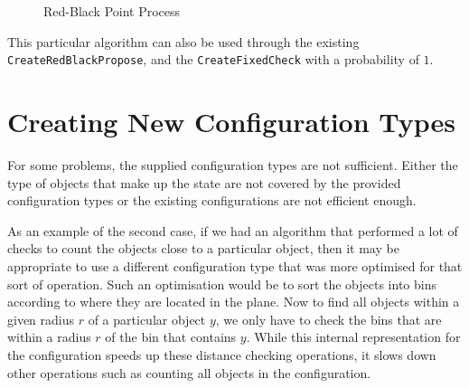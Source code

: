 \begin{figure}[hbt]
\centering
{}
\caption{Red-Black Point Process}
\label{fig:red-black-output}
\end{figure}

This particular algorithm can also be used through the existing
\texttt{Create\-RedBlack\-Propose}, and the \texttt{CreateFixedCheck} with
a probability of $1$.



\section{Creating New Configuration Types}

For some problems, the supplied configuration types are not
sufficient.  Either the type of objects that make up the state are not
covered by the provided configuration types or the existing
configurations are not efficient enough.

As an example of the second case, if we had an algorithm that
performed a lot of checks to count the objects close to a particular
object, then it may be appropriate to use a different configuration
type that was more optimised for that sort of operation.  Such an
optimisation would be to sort the objects into bins according to where
they are located in the plane.  Now to find all objects within a given
radius $r$ of a particular object $y$, we only have to check the bins that
are within a radius $r$ of the bin that contains $y$.  While this
internal representation for the configuration speeds up these distance
checking operations, it slows down other operations such as counting
all objects in the configuration.

